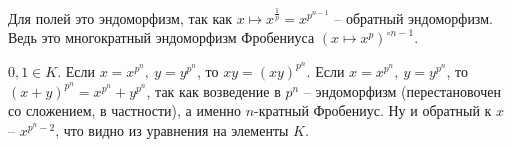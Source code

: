 	Для полей это эндоморфизм, так как $x \mapsto x^{\frac{1}{p}} = x^{p^{n - 1}}$ -- обратный эндоморфизм. Ведь это многократный эндоморфизм Фробениуса $(x \mapsto x^p)^{\circ n - 1}$.
	\endproof

\elm

	
	\proof
	$0, 1 \in K$. Если $x = x^{p^n},\ y = y^{p^n}$, то $xy = (xy)^{p^n}$. Если $x = x^{p^n},\ y = y^{p^n}$, то $(x + y)^{p^n} = x^{p^n} + y^{p^n}$, так как возведение в $p^n$ -- эндоморфизм (перестановочен со сложением, в частности), а именно $n$-кратный Фробениус. Ну и обратный к $x$ -- $x^{p^n - 2}$, что видно из уравнения на элементы $K$.
	\endproof


\elm
